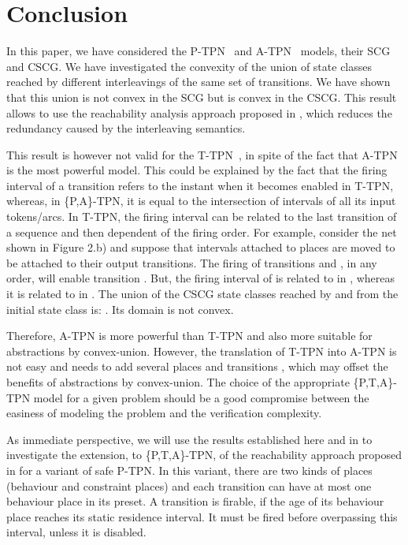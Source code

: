 \documentclass[submission,copyright,creativecommons]{eptcs}
\numberwithin{equation}{section}
\def\tapn{A-TPN}
\def\tppn{P-TPN}
\def\ttpn{T-TPN}
\begin{document}
\section{Conclusion}
\noindent In this paper, we have considered the \tppn~ and \tapn~
models, their SCG and CSCG. We have investigated the convexity of the union of state classes
reached by different interleavings of the same set of transitions.
We have shown that this union is not convex in the SCG but is convex in the CSCG. This result
allows to use the reachability analysis approach proposed in \cite{Maler06}, which reduces the redundancy caused by the interleaving semantics.
\par This result is however not valid for the \ttpn~\cite{infinity08}, in spite of the fact that A-TPN is the most powerful model. This could be explained by the fact that the firing interval of a transition refers to the instant when it becomes enabled in \ttpn, whereas, in \{P,A\}-TPN, it is equal to the intersection of intervals of all its input tokens/arcs. In T-TPN, the firing interval can be related to the last transition of a sequence and then dependent of the firing order. For example, consider the net shown in Figure 2.b) and suppose that intervals attached to places are moved to be attached to their output transitions. The firing of transitions  and , in any order, will enable transition . But, the firing interval of  is related to  in , whereas it is related to  in . The union of the CSCG state classes reached by  and  from the initial state class is: .  Its domain is not convex.
\par Therefore, A-TPN is more powerful than T-TPN and also more suitable for abstractions by convex-union. However, the translation of T-TPN into A-TPN is not easy and needs to add several places and transitions \cite{boyer-FI-08}, which may offset the benefits of abstractions by convex-union. The choice of the appropriate \{P,T,A\}-TPN model for a given problem should be a good compromise between the easiness of modeling the problem and the verification complexity.
\par As immediate perspective, we will use the results established here and in \cite{infinity08} to investigate the extension, to \{P,T,A\}-TPN, of the reachability approach proposed in \cite{Myers} for a variant of safe P-TPN. In this variant, there are two kinds of places (behaviour and constraint places) and each transition can have at most one behaviour place in its preset. A transition is firable, if the age of its behaviour place reaches its static residence interval. It must be fired before overpassing this interval, unless it is disabled.
\end{document}
